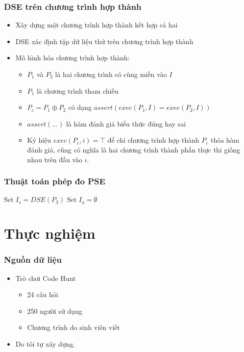 \documentclass{beamer}
\begin{document}
\begin{frame}
  \frametitle{DSE trên chương trình hợp thành}
  \begin{itemize}
  	\item Xây dựng một chương trình hợp thành kết hợp cả hai
  	\item DSE xác định tập dữ liệu thử trên chương trình hợp thành
  	\item Mô hình hóa chương trình hợp thành:
  	\begin{itemize}
  		\item $P_1$ và $P_2$ là hai chương trình có cùng miền vào $I$
  		\item $P_1$ là chương trình tham chiếu
  		\item $P_c = P_1 \oplus P_2$ có dạng
  		$assert(exec(P_{1}, I) = exec(P_{2}, I))$
  		\item  $assert(\dots)$ là hàm đánh giá biểu thức đúng hay sai
  		\item Ký hiệu $exec(P_c,i) = \top$ để chỉ
  		chương trình hợp thành $P_c$ thỏa hàm đánh giá, cũng có nghĩa là hai
  		chương trình thành phần thực thi giống nhau trên đầu vào $i$.
  	\end{itemize}
  \end{itemize}
\end{frame}


\begin{frame}
  \frametitle{Thuật toán phép đo PSE}
  \begin{algorithm}[H]
  	Set $I_{s} = DSE(P_{3})$ \;
  	Set $I_{a} = \emptyset$ \;
  	{  			
  	}
  \end{algorithm}
\end{frame}


\section{Thực nghiệm}

\begin{frame}
  \frametitle{Nguồn dữ liệu}
  \begin{itemize}
  	\item Trò chơi Code Hunt
  	\begin{itemize}
  		\item 24 câu hỏi
  		\item 250 người sử dụng
  		\item Chương trình do sinh viên viết
  	\end{itemize}
  	\item Do tôi tự xây dựng.
  \end{itemize}
\end{frame}
\end{document}
